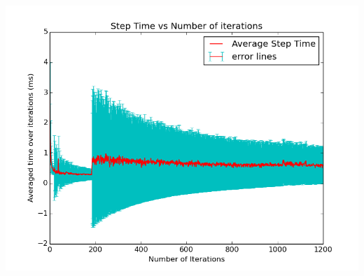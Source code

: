 \documentclass[11pt]{article}
\begin{document}
	\begin{center}
	  \includegraphics[scale=0.5]{images/g26_plot02_1200x150_uneven}
	\end{center}
	
\end{document}
